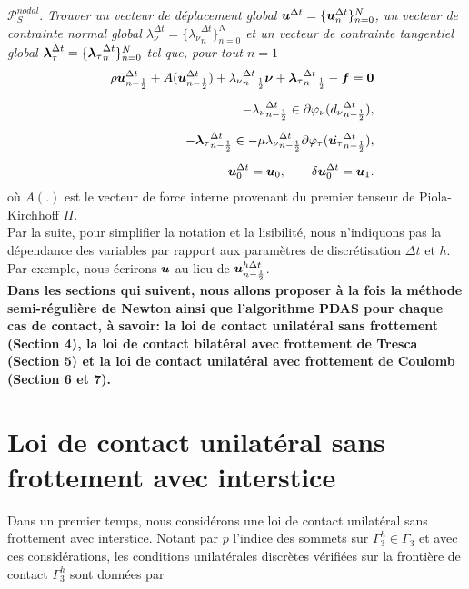 \medskip {} ${\mathcal P}_S^{nodal}$. {\it
	Trouver un vecteur de déplacement global
	$\mbox{\boldmath{$u$}}^{\Delta t}=\{\mbox{\boldmath{$u$}}_n^{\Delta t}\}_{n=0}^N$, un vecteur de contrainte normal global $\lambda_{\nu}^{\Delta t} =\{{\lambda_{\nu}}_{n}^{\Delta t}\}_{n=0}^N$ et un vecteur de contrainte tangentiel global
	$\mbox{\boldmath{$\lambda$}}_{\tau}^{\Delta t} =\{{\mbox{\boldmath{$\lambda$}}_{\tau}}_{n}^{\Delta t}\}_{n=0}^N$ tel que, pour tout $n=1$}
\begin{eqnarray}
&&   \rho \ddot{\mbox{\boldmath{$u$}}}^{\Delta t}_{n-\frac{1}{2}} + A(\mbox{\boldmath{$u$}}^{\Delta t}_{n-\frac{1}{2}}) + {\lambda_{\nu}}^{\Delta t}_{n-\frac{1}{2}}\mbox{\boldmath{$\nu$}} + {\mbox{\boldmath{$\lambda$}}_{\tau}}^{\Delta t}_{n-\frac{1}{2}}- \mbox{\boldmath{$f$}} = \mbox{\boldmath{$0$}} \nonumber  \\[2mm]
&&\label{LMch2} -{\lambda_{\nu}}^{\Delta t}_{n-\frac{1}{2}}\in
\partial\varphi_\nu({d_{\nu}}^{\Delta t}_{n-\frac{1}{2}}),\nonumber\\[2mm]
&&\label{LMfh2} -{\mbox{\boldmath{$\lambda$}}_{\tau}}^{\Delta t}_{n-\frac{1}{2}}\in -\mu  {\lambda_\nu}^{\Delta t}_{n-\frac{1}{2}} \partial\varphi_\tau(\dot{{\mbox{\boldmath{$u$}}}_{\tau}}^{\Delta t}_{n-\frac{1}{2}}), \nonumber\\[2mm]
&&\label{cih12} \mbox{\boldmath{$u$}}^{\Delta t}_{0}=\mbox{\boldmath{$u$}}_{0}, \quad\quad
\delta\mbox{\boldmath{$u$}}^{\Delta t}_{0}=\mbox{\boldmath{$u$}}_{1}.\nonumber
\end{eqnarray}
où $A(.)$ est le vecteur de force interne provenant du premier tenseur de Piola-Kirchhoff ${\Pi}$.\\
Par la suite, pour simplifier la notation et la lisibilité, nous n'indiquons pas la dépendance des variables par rapport aux paramètres de discrétisation $\Delta t$ et
$h$. Par exemple, nous écrirons $\mbox{\boldmath{$u$}}$ au lieu de $\mbox{\boldmath{$u$}}^{h\Delta t}_{n-\frac{1}{2}}$.\\
	
\textbf{Dans les sections qui suivent, nous allons proposer à la fois la méthode semi-régulière de Newton ainsi que l'algorithme PDAS pour chaque cas de contact, à savoir: la loi de contact unilatéral sans frottement (Section 4), la loi de contact bilatéral avec frottement de Tresca (Section 5) et la loi de contact unilatéral avec frottement de Coulomb (Section 6 et 7).}	

\section{Loi de contact unilatéral sans frottement avec interstice}\label{uni_frictionless}
Dans un premier temps, nous considérons une loi de contact unilatéral sans frottement avec interstice.
Notant par $p$ l'indice des sommets sur $\Gamma_3^h \in \Gamma_3$ et avec ces considérations, les conditions unilatérales discrètes vérifiées sur la frontière de contact $\Gamma_3^h$ sont données par

